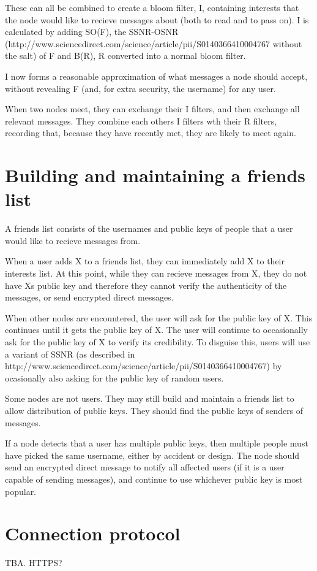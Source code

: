 \documentclass{article}
\begin{document}
These can all be combined to create a bloom filter, I, containing interests that the node would like to recieve messages about (both to read and to pass on). I is calculated by adding SO(F), the SSNR-OSNR (http://www.sciencedirect.com/science/article/pii/S0140366410004767 without the salt) of F and B(R), R converted into a normal bloom filter.

I now forms a reasonable approximation of what messages a node should accept, without revealing F (and, for extra security, the username) for any user.

When two nodes meet, they can exchange their I filters, and then exchange all relevant messages. They combine each others I filters wth their R filters, recording that, because they have recently met, they are likely to meet again.

\section*{Building and maintaining a friends list}
A friends list consists of the usernames and public keys of people that a user would like to recieve messages from.

When a user adds X to a friends list, they can immediately add X to their interests list. At this point, while they can recieve messages from X, they do not have Xs public key and therefore they cannot verify the authenticity of the messages, or send encrypted direct messages.

When other nodes are encountered, the user will ask for the public key of X. This continues until it gets the public key of X. The user will continue to occasionally ask for the public key of X to verify its credibility. To disguise this, users will use a variant of SSNR (as described in http://www.sciencedirect.com/science/article/pii/S0140366410004767) by ocasionally also asking for the public key of random users.
 
Some nodes are not users. They may still build and maintain a friends list to allow distribution of public keys. They should find the public keys of senders of messages.
 
If a node detects that a user has multiple public keys, then multiple people must have picked the same username, either by accident or design. The node should send an encrypted direct message to notify all affected users (if it is a user capable of sending messages), and continue to use whichever public key is most popular.

\section*{Connection protocol}
TBA. HTTPS?
\end{document}
